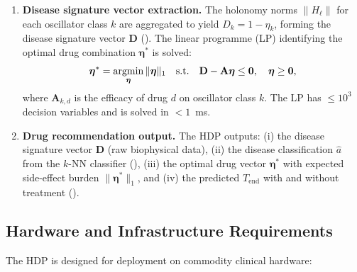 \begin{definition}
\begin{enumerate}[label=\textbf{Step \arabic*:}, leftmargin=*, itemsep=6pt]
    \item \textbf{Disease signature vector extraction.}  The holonomy norms
          $\|H_\ell\|$ for each oscillator class $k$ are aggregated to yield
          $D_k = 1 - \eta_k$, forming the disease signature vector
          $\mathbf{D}$ ().  The linear
          programme (LP) identifying the optimal drug combination
          $\boldsymbol{\eta}^*$ is solved:
          \begin{equation}
          \label{eq:ch04-lp}
              \boldsymbol{\eta}^* = \operatorname*{argmin}_{\boldsymbol{\eta}}
                  \|\boldsymbol{\eta}\|_1
              \quad\text{s.t.}\quad
              \mathbf{D} - \mathbf{A}\boldsymbol{\eta} \leq \mathbf{0},
              \quad \boldsymbol{\eta} \geq \mathbf{0},
          \end{equation}
          where $\mathbf{A}_{k,d}$ is the efficacy of drug $d$ on oscillator
          class $k$.  The LP has $\leq 10^3$ decision variables and is solved
          in $< 1$~ms.

    \item \textbf{Drug recommendation output.}  The HDP outputs: (i) the
          disease signature vector $\mathbf{D}$ (raw biophysical data),
          (ii) the disease classification $\hat{a}$ from the
          $k$-NN classifier (), (iii) the optimal drug
          vector $\boldsymbol{\eta}^*$ with expected side-effect burden
          $\|\boldsymbol{\eta}^*\|_1$, and (iv) the predicted $T_{\mathrm{end}}$
          with and without treatment ().
\end{enumerate}
\end{definition}

\subsection{Hardware and Infrastructure Requirements}

The HDP is designed for deployment on commodity clinical hardware:

